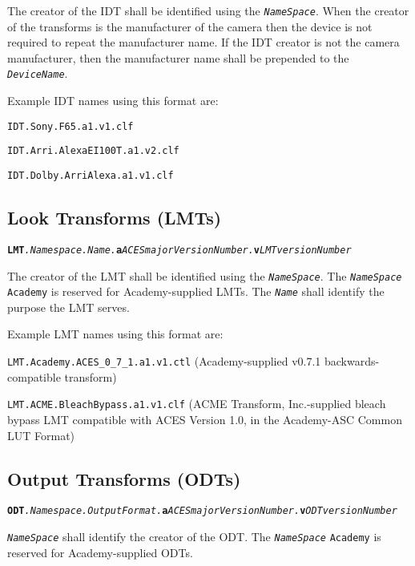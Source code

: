 The creator of the IDT shall be identified using the \texttt{\textit{NameSpace}}. When the creator of the transforms is the manufacturer of the camera then the device is not required to repeat the manufacturer name.  If the IDT creator is not the camera manufacturer, then the manufacturer name shall be prepended to the \texttt{\textit{DeviceName}}.

Example IDT names using this format are: 
\begin{listize}
	\item \texttt{IDT.Sony.F65.a1.v1.clf}
	\item \texttt{IDT.Arri.AlexaEI100T.a1.v2.clf}
	\item \texttt{IDT.Dolby.ArriAlexa.a1.v1.clf}
\end{listize}

\subsection{Look Transforms (LMTs)}

\texttt{\textbf{LMT}\textit{.Namespace.Name.}\textbf{a}\textit{ACESmajorVersionNumber.}\textbf{v}\textit{LMTversionNumber}}

The creator of the LMT shall be identified using the \texttt{\textit{NameSpace}}. The \texttt{\textit{NameSpace}} \texttt{Academy} is reserved for Academy-supplied LMTs. The \texttt{\textit{Name}} shall identify the purpose the LMT serves.

Example LMT names using this format are: 
\begin{listize}
	\item \texttt{LMT.Academy.ACES\_0\_7\_1.a1.v1.ctl} (Academy-supplied v0.7.1 backwards-compatible transform)
	\item \texttt{LMT.ACME.BleachBypass.a1.v1.clf} (ACME Transform, Inc.-supplied bleach bypass LMT compatible with ACES Version 1.0, in the Academy-ASC Common LUT Format)
\end{listize}

\subsection{Output Transforms (ODTs)}

\texttt{\textbf{ODT}\textit{.Namespace.OutputFormat.}\textbf{a}\textit{ACESmajorVersionNumber.}\textbf{v}\textit{ODTversionNumber}}

\texttt{\textit{NameSpace}} shall identify the creator of the ODT. The \texttt{\textit{NameSpace}} \texttt{Academy} is reserved for Academy-supplied ODTs. 

